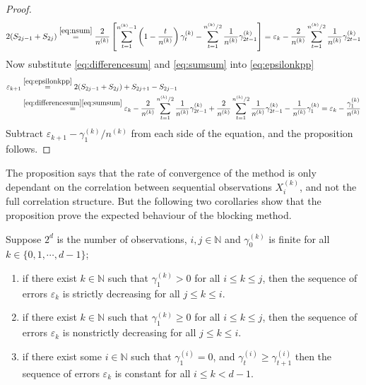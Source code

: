 \documentclass[11pt,english,a4paper]{article}
\begin{document}
\begin{proof}
\begin{align}
2(S_{2j-1} + S_{2j}) \stackrel{\eqref{eq:nsum}}{=} \frac{2}{n^{(k)}} \left[ \sum_{t=1}^{n^{(k)} -1 } \left( 1 - \frac{t}{n^{(k)}} \right)\gamma^{(k)}_{t} -  \sum_{t=1}^{n^{(k)}/2} \frac{1}{n^{(k)}} \gamma^{(k)}_{2t - 1} \right] = \varepsilon_k -\frac{2}{n^{(k)}} \sum_{t=1}^{n^{(k)}/2} \frac{1}{n^{(k)}} \gamma^{(k)}_{2t - 1} \label{eq:sumsum}
\end{align}
Now substitute \eqref{eq:differencesum} and \eqref{eq:sumsum} into \eqref{eq:epsilonkpp}
\begin{align*}
\varepsilon_{  k+1} &\stackrel{\eqref{eq:epsilonkpp}}{=} 2(S_{2j-1} + S_{2j}) + S_{2j+1} - S_{2j-1} \\
&\stackrel{\eqref{eq:differencesum} \eqref{eq:sumsum}}{=} \varepsilon_k -\frac{2}{n^{(k)}} \sum_{t=1}^{n^{(k)}/2} \frac{1}{n^{(k)}} \gamma^{(k)}_{2t - 1}  + \frac{2}{n^{(k)}} \sum_{t=1}^{n^{(k)}/2} \frac{1}{n^{(k)}} \gamma^{(k)}_{2t - 1} - \frac{1}{n^{(k)}} \gamma^{(k)}_{1}  = \varepsilon_k - \frac{\gamma^{(k)}_1 }{n^{(k)}}
\end{align*}
Subtract $\varepsilon_{  k+1} - \gamma^{(k)}_1/n^{(k)}$ from each side of the equation, and the proposition follows.
\end{proof}
The proposition says that the rate of convergence of the method is only dependant on the correlation between sequential observations $X_i^{(k)}$, and not the full correlation structure. But the following two corollaries show that the proposition prove the expected behaviour of the blocking method.
\begin{corollary*}
Suppose $2^d$ is the number of observations, $i,j\in \mathbb{N}$ and $\gamma^{(k)}_0$ is finite for all $k \in \{ 0,1,\cdots, d-1 \}$;
\begin{enumerate}
\item if there exist $k \in \mathbb{N}$ such that $\gamma^{(k)}_1 > 0$ for all $i \leq k \leq j$, then the sequence of errors $\varepsilon_k$ is strictly decreasing for all $j \leq k \leq i$.
\item if there exist $k \in \mathbb{N}$ such that $\gamma^{(k)}_1 \geq 0$ for all $i \leq k \leq j$, then the sequence of errors $\varepsilon_k$ is nonstrictly decreasing for all $j \leq k \leq i$.
\item if there exist some $i \in \mathbb{N}$ such that $\gamma^{(i)}_1 = 0$, and $\gamma^{(i)}_t \geq \gamma^{(i)}_{t+1}$ then the sequence of errors $\varepsilon_k$ is constant for all $i \leq k < d-1$.
\end{enumerate}
\end{corollary*}
\end{document}
